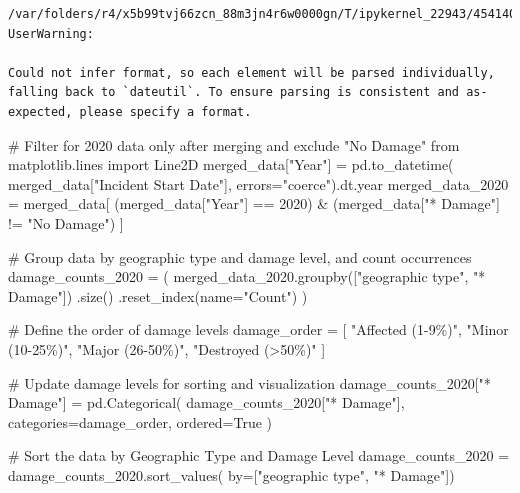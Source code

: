 \documentclass[
  letterpaper,
  DIV=11,
  numbers=noendperiod]{scrartcl}
\newenvironment{Shaded}{\begin{snugshade}}{\end{snugshade}}
\newcommand{\CommentTok}[1]{\textcolor[rgb]{0.37,0.37,0.37}{#1}}
\newcommand{\DecValTok}[1]{\textcolor[rgb]{0.68,0.00,0.00}{#1}}
\newcommand{\ImportTok}[1]{\textcolor[rgb]{0.00,0.46,0.62}{#1}}
\newcommand{\NormalTok}[1]{\textcolor[rgb]{0.00,0.23,0.31}{#1}}
\newcommand{\OperatorTok}[1]{\textcolor[rgb]{0.37,0.37,0.37}{#1}}
\newcommand{\StringTok}[1]{\textcolor[rgb]{0.13,0.47,0.30}{#1}}
\newcommand{\VariableTok}[1]{\textcolor[rgb]{0.07,0.07,0.07}{#1}}
\begin{document}
\begin{verbatim}
/var/folders/r4/x5b99tvj66zcn_88m3jn4r6w0000gn/T/ipykernel_22943/454140121.py:2: UserWarning:

Could not infer format, so each element will be parsed individually, falling back to `dateutil`. To ensure parsing is consistent and as-expected, please specify a format.
\end{verbatim}

\begin{Shaded}
\begin{Highlighting}[]
\CommentTok{\# Filter for 2020 data only after merging and exclude "No Damage"}
\ImportTok{from}\NormalTok{ matplotlib.lines }\ImportTok{import}\NormalTok{ Line2D}
\NormalTok{merged\_data[}\StringTok{"Year"}\NormalTok{] }\OperatorTok{=}\NormalTok{ pd.to\_datetime(}
\NormalTok{    merged\_data[}\StringTok{"Incident Start Date"}\NormalTok{], errors}\OperatorTok{=}\StringTok{"coerce"}\NormalTok{).dt.year}
\NormalTok{merged\_data\_2020 }\OperatorTok{=}\NormalTok{ merged\_data[}
\NormalTok{    (merged\_data[}\StringTok{"Year"}\NormalTok{] }\OperatorTok{==} \DecValTok{2020}\NormalTok{) }\OperatorTok{\&}
\NormalTok{    (merged\_data[}\StringTok{"* Damage"}\NormalTok{] }\OperatorTok{!=} \StringTok{"No Damage"}\NormalTok{)}
\NormalTok{]}

\CommentTok{\# Group data by geographic type and damage level, and count occurrences}
\NormalTok{damage\_counts\_2020 }\OperatorTok{=}\NormalTok{ (}
\NormalTok{    merged\_data\_2020.groupby([}\StringTok{"geographic type"}\NormalTok{, }\StringTok{"* Damage"}\NormalTok{])}
\NormalTok{    .size()}
\NormalTok{    .reset\_index(name}\OperatorTok{=}\StringTok{"Count"}\NormalTok{)}
\NormalTok{)}

\CommentTok{\# Define the order of damage levels}
\NormalTok{damage\_order }\OperatorTok{=}\NormalTok{ [}
    \StringTok{"Affected (1{-}9\%)"}\NormalTok{,}
    \StringTok{"Minor (10{-}25\%)"}\NormalTok{,}
    \StringTok{"Major (26{-}50\%)"}\NormalTok{,}
    \StringTok{"Destroyed (\textgreater{}50\%)"}
\NormalTok{]}

\CommentTok{\# Update damage levels for sorting and visualization}
\NormalTok{damage\_counts\_2020[}\StringTok{"* Damage"}\NormalTok{] }\OperatorTok{=}\NormalTok{ pd.Categorical(}
\NormalTok{    damage\_counts\_2020[}\StringTok{"* Damage"}\NormalTok{], categories}\OperatorTok{=}\NormalTok{damage\_order, ordered}\OperatorTok{=}\VariableTok{True}
\NormalTok{)}

\CommentTok{\# Sort the data by Geographic Type and Damage Level}
\NormalTok{damage\_counts\_2020 }\OperatorTok{=}\NormalTok{ damage\_counts\_2020.sort\_values(}
\NormalTok{    by}\OperatorTok{=}\NormalTok{[}\StringTok{"geographic type"}\NormalTok{, }\StringTok{"* Damage"}\NormalTok{])}


\end{Highlighting}
\end{Shaded}
\end{document}
